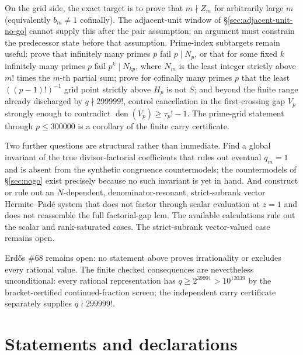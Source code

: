 \documentclass[11pt]{article}
\newcommand{\Ser}{S}
\begin{document}
On the grid side, the exact target is to prove that
$m\nmid Z_m$ for arbitrarily large $m$ (equivalently $b_m\ne1$ cofinally).
The adjacent-unit window of \S\ref{sec:adjacent-unit-no-go} cannot supply this
after the pair assumption; an argument must constrain the predecessor state
before that assumption.
Prime-index subtargets remain useful:
prove that infinitely many primes $p$ fail
$p\mid N_p$, or that for some fixed $k$ infinitely many primes $p$ fail
$p^k\mid N_{kp}$, where $N_m$ is the least integer strictly above $m!$ times the
$m$-th partial sum; prove for cofinally many primes $p$ that the least
$((p-1)!)^{-1}$ grid point strictly above $H_p$ is not $\Ser$; and beyond the
finite range already discharged by $q\nmid299999!$, control cancellation in
the first-crossing gap $V_p$ strongly enough to contradict
$\operatorname{den}(V_p)\ge\tau_p!-1$.  The prime-grid statement through
$p\le300000$ is a corollary of the finite carry certificate.

Two further questions are structural rather than immediate.  Find a global
invariant of the true divisor-factorial coefficients that rules out eventual
$q_m=1$ and is absent from the synthetic congruence countermodels; the
countermodels of \S\ref{sec:nogo} exist precisely because no such invariant is
yet in hand.  And construct or rule out an $N$-dependent, denominator-resonant,
strict-subrank vector Hermite--Pad\'e system that does not factor through scalar
evaluation at $z=1$ and does not reassemble the full factorial-gap lcm.  The
available calculations rule out the scalar and rank-saturated cases.  The
strict-subrank vector-valued case remains open.

Erd\H{o}s \#68 remains open: no statement above proves irrationality or
excludes every rational value.  The finite checked consequences are nevertheless
unconditional: every rational representation has
$q\ge2^{39991}>10^{12039}$ by the bracket-certified continued-fraction
screen; the independent carry certificate separately supplies
$q\nmid299999!$.

\section*{Statements and declarations}
\end{document}
